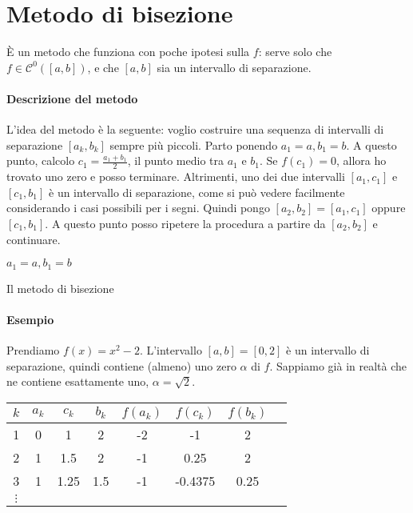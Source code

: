 \documentclass[a4paper]{report}
\theoremstyle{definiton}
\theoremstyle{remark}
\begin{document}
\section{Metodo di bisezione}

È un metodo che funziona con poche ipotesi sulla $f$: serve solo che $f \in \mathcal{C}^0([a,b])$, e che $[a,b]$ sia un intervallo di separazione.

\paragraph{Descrizione del metodo} L'idea del metodo è la seguente: voglio costruire una sequenza di intervalli di separazione $[a_k,b_k]$ sempre più piccoli. Parto ponendo $a_1 = a, b_1 = b$. A questo punto, calcolo $c_1 = \frac{a_1+b_1}{2}$, il punto medio tra $a_1$ e $b_1$. Se $f(c_1) = 0$, allora ho trovato uno zero e posso terminare. Altrimenti, uno dei due intervalli $[a_1,c_1]$ e $[c_1,b_1]$ è un intervallo di separazione, come si può vedere facilmente considerando i casi possibili per i segni. Quindi pongo $[a_2,b_2] = [a_1,c_1]$ oppure $[c_1,b_1]$. A questo punto posso ripetere la procedura a partire da $[a_2,b_2]$ e continuare.

\begin{algorithm}
$a_1=a,b_1=b$\;
\caption{Il metodo di bisezione}
\end{algorithm}

\paragraph{Esempio} Prendiamo $f(x) = x^2 - 2$. L'intervallo $[a,b] = [0,2]$ è un intervallo di separazione, quindi contiene (almeno) uno zero $\alpha$ di $f$. Sappiamo già in realtà che ne contiene esattamente uno, $\alpha=\sqrt{2}$.

\begin{center}
    \begin{tabular}{cccccccc}
        \toprule
        $k$ & $a_k$ & $c_k$ & $b_k$ & $f(a_k)$ & $f(c_k)$ & $f(b_k)$\\
        \midrule
        1 & 0 & 1 & 2 & -2 & -1 & 2\\
        2 & 1 & 1.5 & 2 & -1 & 0.25 & 2\\
        3 & 1 & 1.25 & 1.5 & -1 & -0.4375 & 0.25\\
        $\vdots$\\
        \bottomrule
    \end{tabular}
\end{center}
\end{document}
